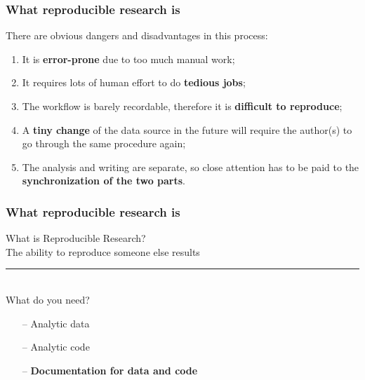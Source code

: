 \documentclass{beamer}
\begin{document}
\begin{frame}
\frametitle{What reproducible research is}

\Large There are obvious dangers and disadvantages in this process:
\small\begin{enumerate}
	\item It is \textbf{error-prone} due to too much manual work;
	\item It requires lots of human effort to do \textbf{tedious jobs}; 
	\item The workflow is barely recordable, therefore it is \textbf{difficult to reproduce};
	\item A \textbf{tiny change} of the data source in the future will require the author(s) to go through the same procedure again;
	\item The analysis and writing are separate, so close attention has to be paid to the \textbf{synchronization of the two parts}.
\end{enumerate}
\end{frame}


\begin{frame}
\frametitle{What reproducible research is}
\Large \centering What is Reproducible Research?\\ 
{\sc The ability to reproduce someone else results}\\
\rule{\textwidth}{0.1pt}\\
\Large \centering What do you need?\\ 
\begin{itemize}
\item[--] Analytic data 
\item[--] Analytic code
\item[--] {\bf Documentation for data and code} 
\end{itemize}
\end{frame}


\end{document}
